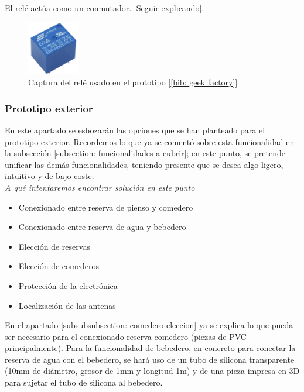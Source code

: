 \documentclass[12pt]{article}
\begin{document}
	\noindent El relé actúa como un conmutador. [Seguir explicando]. \\
	
	\begin{figure}[h]
		\begin{center}
			\includegraphics[width=0.2\textwidth]{img/rele.png}
			\caption{Captura del relé usado en el prototipo [\ref{bib: geek factory}]}
			\label{Captura relé}
		\end{center}
	\end{figure}
	
	\subsubsection{Prototipo exterior}
	\label{subsubsection: prototipo exterior}
	\noindent En este apartado se esbozarán las opciones que se han planteado para el prototipo exterior. Recordemos lo que ya se comentó sobre esta funcionalidad en la subsección \ref{subsection: funcionalidades a cubrir}; en este punto, se pretende unificar las demás funcionalidades, teniendo presente que se desea algo ligero, intuitivo y de bajo coste. \\
	
	\noindent \textit{A qué intentaremos encontrar solución en este punto} \\
	
	\begin{itemize}
		\item Conexionado entre reserva de pienso y comedero
		\item Conexionado entre reserva de agua y bebedero
		\item Elección de reservas
		\item Elección de comederos
		\item Protección de la electrónica
		\item Localización de las antenas
	\end{itemize}

	\noindent En el apartado \ref{subsubsubsection: comedero eleccion}  ya se explica lo que pueda ser necesario para el conexionado reserva-comedero (piezas de PVC principalmente). Para la funcionalidad de bebedero, en concreto para conectar la reserva de agua con el bebedero, se hará uso de un tubo de silicona transparente (10mm de diámetro, grosor de 1mm y longitud 1m) y de una pieza impresa en 3D para sujetar el tubo de silicona al bebedero. \\
	
\end{document}
